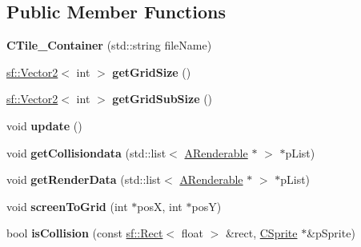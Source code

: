 \subsection*{Public Member Functions}
\begin{DoxyCompactItemize}
\item 
\hypertarget{classCTile__Container_ab3f79e82961b644d422874eb558ea312}{{\bfseries C\-Tile\-\_\-\-Container} (std\-::string file\-Name)}\label{classCTile__Container_ab3f79e82961b644d422874eb558ea312}

\item 
\hypertarget{classCTile__Container_ae8a4d2b6e49fbec47d92cbb19bb9d3c7}{\hyperlink{classsf_1_1Vector2}{sf\-::\-Vector2}$<$ int $>$ {\bfseries get\-Grid\-Size} ()}\label{classCTile__Container_ae8a4d2b6e49fbec47d92cbb19bb9d3c7}

\item 
\hypertarget{classCTile__Container_a876984278369d0cafc24890959128ed0}{\hyperlink{classsf_1_1Vector2}{sf\-::\-Vector2}$<$ int $>$ {\bfseries get\-Grid\-Sub\-Size} ()}\label{classCTile__Container_a876984278369d0cafc24890959128ed0}

\item 
\hypertarget{classCTile__Container_abe6e19de544f042671094697bb83fde9}{void {\bfseries update} ()}\label{classCTile__Container_abe6e19de544f042671094697bb83fde9}

\item 
\hypertarget{classCTile__Container_ae61b573ed7b47bea750040a26b492632}{void {\bfseries get\-Collisiondata} (std\-::list$<$ \hyperlink{classARenderable}{A\-Renderable} $\ast$ $>$ $\ast$p\-List)}\label{classCTile__Container_ae61b573ed7b47bea750040a26b492632}

\item 
\hypertarget{classCTile__Container_a48c74611efadee522595362a79620bff}{void {\bfseries get\-Render\-Data} (std\-::list$<$ \hyperlink{classARenderable}{A\-Renderable} $\ast$ $>$ $\ast$p\-List)}\label{classCTile__Container_a48c74611efadee522595362a79620bff}

\item 
\hypertarget{classCTile__Container_a14f90644c3a992813a629cea3e81aa38}{void {\bfseries screen\-To\-Grid} (int $\ast$pos\-X, int $\ast$pos\-Y)}\label{classCTile__Container_a14f90644c3a992813a629cea3e81aa38}

\item 
\hypertarget{classCTile__Container_adfda15836508531632c4ca506caf6360}{bool {\bfseries is\-Collision} (const \hyperlink{classsf_1_1Rect}{sf\-::\-Rect}$<$ float $>$ \&rect, \hyperlink{classCSprite}{C\-Sprite} $\ast$\&p\-Sprite)}\label{classCTile__Container_adfda15836508531632c4ca506caf6360}


\end{DoxyCompactItemize}
